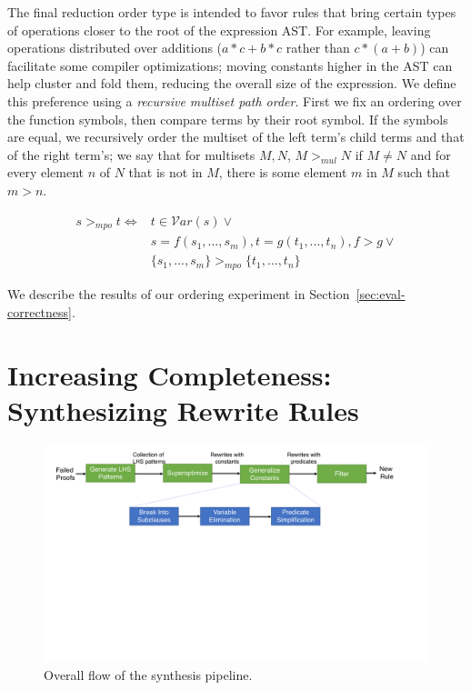 \documentclass[sigplan,10pt,review,anonymous]{acmart}\settopmatter{printfolios=true,printccs=false,printacmref=false}
\begin{document}
The final reduction order type is intended to favor rules that bring certain
types of operations closer to the root of the expression AST. For example,
leaving operations distributed over additions ($a*c + b*c$ rather than
$c*(a +b)$) can facilitate some compiler optimizations; moving constants higher in the
AST can help cluster and fold them, reducing the overall size of the expression.
We define this preference using a \emph{recursive multiset path order}. First we
fix an ordering over the function symbols, then compare terms by their root
symbol. If the symbols are equal, we recursively order the multiset of the left
term's child terms and that of the right term's; we say that for multisets $M,
N$, $M >_{mul} N$ if $M \neq N$ and for every element $n$ of $N$ that is not in
$M$, there is some element $m$ in $M$ such that $m > n$.

\begin{equation}
\begin{split}
s >_{mpo} t \iff & t \in \mathcal{V}ar(s) \vee \\
              &  s = f(s_1,\dots,s_m), t = g(t_1,...,t_n), f > g \vee \\
               & \{s_1, \dots, s_m\} >_{mpo} \{t_1,\dots,t_n\}
\end{split}
\end{equation}

We describe the results of our ordering experiment in Section~\ref{sec:eval-correctness}.




\section{Increasing Completeness: Synthesizing Rewrite Rules}
\begin{figure}
\includegraphics[width=1.9\columnwidth]{figures/synthesis-flow.pdf}
\caption{Overall flow of the synthesis pipeline.}
\label{fig:synthesis-flow}
\end{figure}
\end{document}
